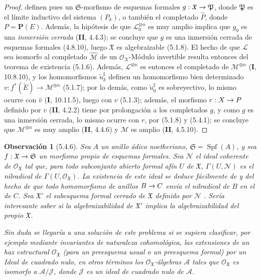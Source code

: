 \documentclass[10pt,oneside,openany]{book}
\theoremstyle{egaenv}\newtheorem*{env}{---}
\theoremstyle{egastatement}
\theoremstyle{egadescription}
\newtheorem*{remark}{Observación}
\newcommand{\oldpage}[2][]{\marginnote{\normalfont\scriptsize\textbf{#1}\,|\,#2}\ignorespaces}
\renewcommand{\to}{\mathchoice{\longrightarrow}{\rightarrow}{\rightarrow}{\rightarrow}}
\begin{document}
\begin{proof}
definen pues un $\mathfrak S$-morfismo de esquemas formales
$g:\mathfrak X\to\mathfrak P$, donde $\mathfrak P$ es el límite inductivo del
sistema $(P_k)$, o también el completado $\widehat P$, donde $P=\mathbf P(E)$.
Además, la hipótesis de que $\mathcal L_0^{\otimes n}$ es muy amplio implica que
$g_0$ es una \emph{inmersión cerrada} (\textbf{II}, 4.4.3); se concluye que $g$ es una
inmersión cerrada de esquemas formales (4.8.10), luego $\mathfrak X$ es
algebraizable (5.1.8). El hecho de que $\mathcal L$ sea isomorfo al completado
$\widehat{\mathcal M}$ de un $\mathcal O_X$-Módulo invertible resulta entonces del
teorema de existencia (5.1.6). Además, $\mathcal L^{\otimes n}$ es entonces el
completado de $\mathcal M^{\otimes n}$ (\textbf{I}, 10.8.10), y los homomorfismos
$\widetilde u_k^\sharp$ definen un homomorfismo bien determinado
$v:f^*(\widetilde E)\longrightarrow\mathcal M^{\otimes n}$
(5.1.7); por lo demás, como $\widetilde u_0^\sharp$ es sobreyectivo, lo mismo ocurre con
$\widehat v$ (\textbf{I}, 10.11.5), luego con $v$ (5.1.3); además, el morfismo
$r:X\to P$ definido por $v$ (\textbf{II}, 4.2.2) tiene por prolongación a los completados $g$,
y como $g$ es una inmersión cerrada, lo mismo ocurre con $r$, por (5.1.8)
y (5.4.1); se concluye que $\mathcal M^{\otimes n}$ es muy amplio
(\textbf{II}, 4.4.6) y $\mathcal M$ es amplio (\textbf{II}, 4.5.10).
\end{proof}

\begin{remark}[5.4.6]
\label{III.5.4.6}
\label{III.5.4.6-fr}
Sea $A$ un anillo ádico noetheriano, $\mathfrak S=\operatorname{Spf}(A)$, y sea
$f:\mathfrak X\to\mathfrak S$ un morfismo propio de esquemas
formales. Sea $\mathcal N$ el ideal coherente de
$\mathcal O_{\mathfrak X}$ tal que, para todo subconjunto abierto
formal afín $U$ de $\mathfrak X$,
$\Gamma(U,\mathcal N)$
es el nilradical de
$\Gamma(U,\mathcal O_{\mathfrak X})$. La existencia de este ideal
se deduce fácilmente de  y del hecho de que
todo homomorfismo de anillos $B\to C$ envía el nilradical de $B$ en
el de $C$. Sea $\mathfrak X'$ el subesquema formal cerrado de
$\mathfrak X$ definido por $\mathcal N$
. Sería interesante saber si la
algebraizabilidad de $\mathfrak X'$ implica la algebraizabilidad del
propio $\mathfrak X$.

Sin duda se llegaría a una solución de este problema si se supiera
clasificar, por ejemplo mediante invariantes
\oldpage[III]{159}
de naturaleza cohomológica, las \emph{extensiones} de un haz estructural
$\mathcal O_{\mathfrak X}$ (para un preesquema usual o un preesquema formal) por un Ideal de cuadrado nulo, en otros términos los $\mathcal O_{\mathfrak X}$-álgebras $\mathcal A$ tales que $\mathcal O_{\mathfrak X}$ es isomorfo a
$\mathcal A/\mathcal J$, donde $\mathcal J$ es un
ideal de cuadrado nulo de $\mathcal A$.
\end{remark}
\end{document}
